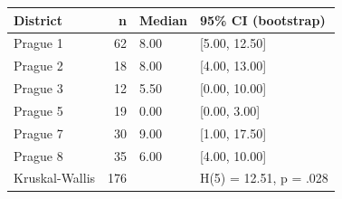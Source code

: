 \begin{tabular}{lrll}
  \toprule
District & n & Median & 95\% CI (bootstrap) \\ 
  \midrule
Prague 1 &  62 & 8.00 & [5.00, 12.50] \\ 
  Prague 2 &  18 & 8.00 & [4.00, 13.00] \\ 
  Prague 3 &  12 & 5.50 & [0.00, 10.00] \\ 
  Prague 5 &  19 & 0.00 & [0.00, 3.00] \\ 
  Prague 7 &  30 & 9.00 & [1.00, 17.50] \\ 
  Prague 8 &  35 & 6.00 & [4.00, 10.00] \\ 
  Kruskal-Wallis & 176 &  & H(5) = 12.51, p = .028 \\ 
   \bottomrule
\end{tabular}
